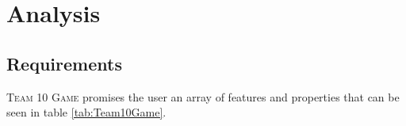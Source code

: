 \chapter{Analysis}

\section{Requirements}
% 
% 
% 
% 
\textsc{Team 10 Game} promises the user an array of features and properties that can be seen in table \ref{tab:Team10Game}. 
